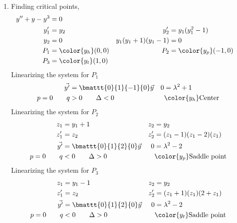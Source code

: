 \begin{enumerate}
    \item Finding critical points,
          \begin{align}
              y'' + y - y^{3}        & = 0                     \\
              y_1'                   & = y_2                 &
              y_2'                   & = y_1(y_1^{2} - 1)      \\
              y_2                    & = 0                   &
              y_1 (y_1 + 1)(y_1 - 1) & = 0                     \\
              P_1                    & = \color{y_h}(0, 0)   &
              P_2                    & = \color{y_p} (-1, 0)   \\
              P_3                    & = \color{y_t} (1, 0)
          \end{align}
          Linearizing the system for $ P_1 $
          \begin{align}
              \vec{y'}       & = \bmattt{0}{1}{-1}{0} \vec{y} &
              0              & = \lambda^{2} + 1                \\
              p = 0 \qquad q & > 0 \qquad \Delta < 0          &
                             & \color{y_h} \text{Center}
          \end{align}
          Linearizing the system for $ P_2 $
          \begin{align}
              z_1            & = y_1 + 1                       &
              z_2            & = y_2                             \\
              z_1'           & = z_2                           &
              z_2'           & = (z_1 - 1)(z_1 - 2)(z_1)         \\
              \vec{y'}       & = \bmattt{0}{1}{2}{0} \vec{y}   &
              0              & = \lambda^{2} - 2                 \\
              p = 0 \qquad q & < 0 \qquad \Delta > 0           &
                             & \color{y_p} \text{Saddle point}
          \end{align}
          Linearizing the system for $ P_3 $
          \begin{align}
              z_1            & = y_1 - 1                       &
              z_2            & = y_2                             \\
              z_1'           & = z_2                           &
              z_2'           & = (z_1 + 1)(z_1)(2 + z_1)         \\
              \vec{y'}       & = \bmattt{0}{1}{2}{0} \vec{y}   &
              0              & = \lambda^{2} - 2                 \\
              p = 0 \qquad q & < 0 \qquad \Delta > 0           &
                             & \color{y_t} \text{Saddle point}
          \end{align}


\end{enumerate}
